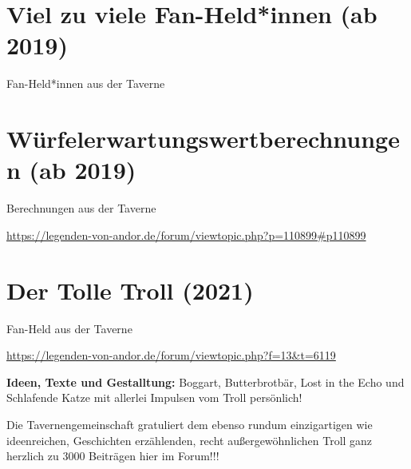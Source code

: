 {\parindent0pt




\section{Viel zu viele Fan-Held*innen (ab 2019)}

\begin{center}
    Fan-Held*innen aus der Taverne
\end{center}






\newpage


\section{Würfelerwartungswertberechnungen (ab 2019)}


\begin{center}
    Berechnungen aus der Taverne

    \url{https://legenden-von-andor.de/forum/viewtopic.php?p=110899#p110899}
\end{center}










\newpage
\section{Der Tolle Troll (2021)}

\begin{center}
    Fan-Held aus der Taverne

    \url{https://legenden-von-andor.de/forum/viewtopic.php?f=13&t=6119}
\end{center}




\textbf{Ideen, Texte und Gestalltung:} Boggart, Butterbrotbär, Lost in the Echo und Schlafende Katze mit allerlei Impulsen vom Troll persönlich!\bigskip

Die Tavernengemeinschaft gratuliert dem ebenso rundum einzigartigen wie ideenreichen, Geschichten erzählenden, recht außergewöhnlichen Troll ganz herzlich zu 3000 Beiträgen hier im Forum!!!

}
